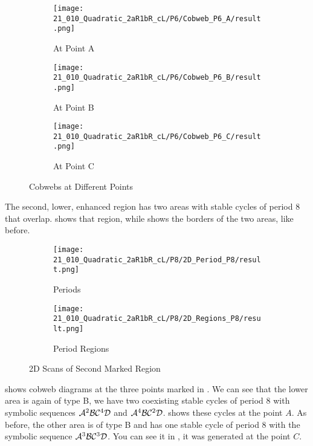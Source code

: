 \begin{figure}
	\centering
	\begin{subfigure}{0.3\textwidth}
		\centering
		\texttt{[image: 21\_010\_Quadratic\_2aR1bR\_cL/P6/Cobweb\_P6\_A/result.png]}
		\caption{At Point A}
		\label{fig:quad.full.2aR1bR_cL.1.CobwebA}
	\end{subfigure}
	\begin{subfigure}{0.3\textwidth}
		\centering
		\texttt{[image: 21\_010\_Quadratic\_2aR1bR\_cL/P6/Cobweb\_P6\_B/result.png]}
		\caption{At Point B}
		\label{fig:quad.full.2aR1bR_cL.1.CobwebB}
	\end{subfigure}
	\begin{subfigure}{0.3\textwidth}
		\centering
		\texttt{[image: 21\_010\_Quadratic\_2aR1bR\_cL/P6/Cobweb\_P6\_C/result.png]}
		\caption{At Point C}
		\label{fig:quad.full.2aR1bR_cL.1.CobwebC}
	\end{subfigure}
	\caption{Cobwebs at Different Points}
	\label{fig:quad.full.2aR1bR_cL.1.Cobwebs}
\end{figure}

The second, lower, enhanced region has two areas with stable cycles of period 8 that overlap.
 shows that region, while  shows the borders of the two areas, like before.

\begin{figure}
	\centering
	\begin{subfigure}{0.4\textwidth}
		\centering
		\texttt{[image: 21\_010\_Quadratic\_2aR1bR\_cL/P8/2D\_Period\_P8/result.png]}
		\caption{Periods}
		\label{fig:quadratic.full.2aR1bR_cL.2d.2}
	\end{subfigure}
	\begin{subfigure}{0.4\textwidth}
		\centering
		\texttt{[image: 21\_010\_Quadratic\_2aR1bR\_cL/P8/2D\_Regions\_P8/result.png]}
		\caption{Period Regions}
		\label{fig:quadratic.regions.2aR1bR_cL.2d.2}
	\end{subfigure}
	\caption{2D Scans of Second Marked Region}
\end{figure}

 shows cobweb diagrams at the three points marked in .
We can see that the lower area is again of type B, we have two coexisting stable cycles of period 8 with symbolic sequences $\mathcal{A}^2\mathcal{B}\mathcal{C}^4\mathcal{D}$ and $\mathcal{A}^4\mathcal{B}\mathcal{C}^2\mathcal{D}$.
 shows these cycles at the point $A$.
As before, the other area is of type B and has one stable cycle of period 8 with the symbolic sequence $\mathcal{A}^3\mathcal{B}\mathcal{C}^3\mathcal{D}$.
You can see it in , it was generated at the point $C$.

